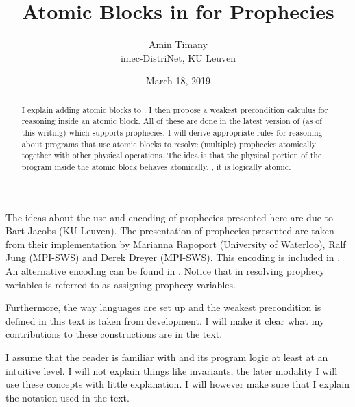 \documentclass{article}
\title{\bfseries Atomic Blocks in \Iris{} for Prophecies}
\author{Amin Timany\\ {imec-DistriNet, KU Leuven}}
\date{March 18, 2019}
\begin{document}
\maketitle

\begin{abstract}
  I explain adding atomic blocks to \Iris{}. I then propose a weakest
  precondition calculus for reasoning inside an atomic block. All of
  these are done in the latest version of \Iris{} (as of this writing)
  which supports prophecies. I will derive appropriate rules for
  reasoning about programs that use atomic blocks to resolve
  (multiple) prophecies atomically together with other physical
  operations. The idea is that the physical portion of the program
  inside the atomic block behaves atomically, \ie, it is logically
  atomic.
\end{abstract}

\begin{remark*}
  The ideas about the use and encoding of prophecies presented here
  are due to Bart Jacobs (KU Leuven). The presentation of prophecies
  presented are taken from their implementation by Marianna Rapoport
  (University of Waterloo), Ralf Jung (MPI-SWS) and Derek Dreyer
  (MPI-SWS). This encoding is included in \Iris. An alternative
  encoding can be found in \citet{KULeuven-2-2363661}. Notice that in
  \loccit{} resolving prophecy variables is referred to as assigning
  prophecy variables.

  Furthermore, the way languages are set up and the weakest
  precondition is defined in this text is taken from \Iris{}
  \cite{iris, iris2, iris3, irisjfp} development. I will make it clear
  what my contributions to these constructions are in the text.

  I assume that the reader is familiar with \Iris{} and its program
  logic at least at an intuitive level. I will not explain things like
  invariants, the later modality \etc{} I will use these concepts with
  little explanation. I will however make sure that I explain the
  notation used in the text.
\end{remark*}
\end{document}
